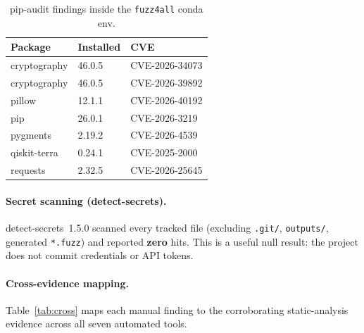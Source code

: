 \documentclass[conference]{IEEEtran}
\begin{document}
\begin{table}[t]
\caption{pip-audit findings inside the \texttt{fuzz4all} conda env.}
\label{tab:pip-audit}
\centering\renewcommand{\arraystretch}{1.15}
\begin{tabularx}{\columnwidth}{Xll}
\toprule
\textbf{Package} & \textbf{Installed} & \textbf{CVE} \\
\midrule
cryptography  & 46.0.5  & CVE-2026-34073 \\
cryptography  & 46.0.5  & CVE-2026-39892 \\
pillow        & 12.1.1  & CVE-2026-40192 \\
pip           & 26.0.1  & CVE-2026-3219  \\
pygments      & 2.19.2  & CVE-2026-4539  \\
qiskit-terra  & 0.24.1  & CVE-2025-2000  \\
requests      & 2.32.5  & CVE-2026-25645 \\
\bottomrule
\end{tabularx}
\end{table}

\paragraph{Secret scanning (detect-secrets).}
detect-secrets~1.5.0 scanned every tracked file (excluding
\texttt{.git/}, \texttt{outputs/}, generated \texttt{*.fuzz}) and
reported \textbf{zero} hits. This is a useful null result: the project
does not commit credentials or API tokens.

\paragraph{Cross-evidence mapping.}
Table~\ref{tab:cross} maps each manual finding to the corroborating
static-analysis evidence across all seven automated tools.
\end{document}
